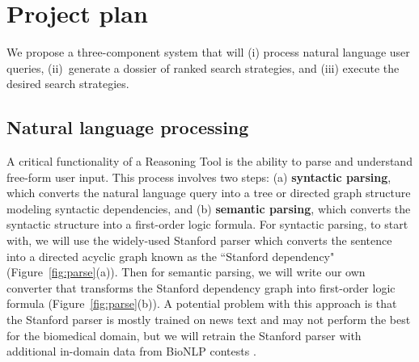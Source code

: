 \documentclass[11pt,notitlepage]{article}
\begin{document}

\section{Project plan}
We propose a three-component system that will (i) process natural language user
queries, (ii)~generate a dossier of ranked search strategies, and (iii) execute
the desired search strategies.
\subsection{Natural language processing}
\label{section:NLP}
A critical functionality of a Reasoning Tool is the ability to parse and
understand free-form user input. This process involves two steps:
(a) {\bf syntactic parsing}, which converts the natural language query into a tree or directed graph structure modeling syntactic dependencies,
and (b) {\bf semantic parsing}, which converts the syntactic structure into a first-order logic formula.
For syntactic parsing, to start with,
we will use the widely-used Stanford parser %
which converts the sentence into a directed acyclic graph 
known as the ``Stanford dependency" \cite{stanforddep:2008} (Figure~\ref{fig:parse}(a)).
Then for semantic parsing, we will write our own converter 
that transforms the Stanford dependency graph into first-order logic formula (Figure~\ref{fig:parse}(b)).
A potential problem with this approach is that the Stanford parser is mostly trained on news text and may not perform the best for the biomedical domain, but we will retrain the Stanford parser with additional in-domain data from BioNLP contests \cite{bionlp:2013}.
\end{document}
